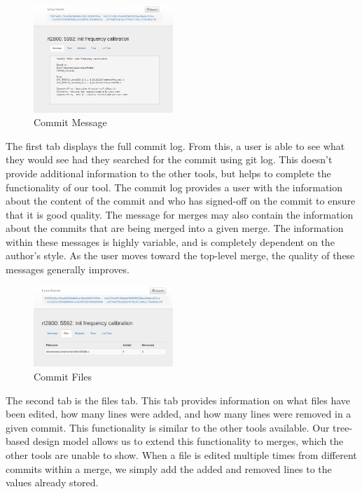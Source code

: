 \documentclass[conference, draftclsnofoot]{IEEEtran}
\begin{document}
\begin{figure}[h]
	\centering
	\includegraphics[width=0.47\textwidth]{figures/message_view.png}
	\caption{Commit Message}
	\label{fig:message}
\end{figure}

The first tab displays the full commit log. From this, a user is able to see
what they would see had they searched for the commit using git log. This
doesn't provide additional information to the other tools, but helps to
complete the functionality of our tool. The commit log provides a user with
the information about the content of the commit and who has signed-off on the
commit to ensure that it is good quality. The message for merges may also
contain the information about the commits that are being merged into a given
merge. The information within these messages is highly variable, and is
completely dependent on the author's style. As the user moves toward the
top-level merge, the quality of these messages generally improves.

\begin{figure}[h]
	\centering
	\includegraphics[width=0.47\textwidth]{figures/file_view.png}
	\caption{Commit Files}
	\label{fig:files}
\end{figure}

The second tab is the files tab. This tab provides information on what files
have been edited, how many lines were added, and how many lines were removed in
a given commit. This functionality is similar to the other tools available. Our
tree-based design model allows us to extend this functionality to merges, which
the other tools are unable to show. When a file is edited multiple times from
different commits within a merge, we simply add the added and removed lines to
the values already stored.
\end{document}
